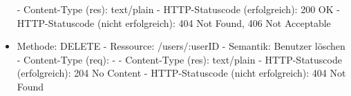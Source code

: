 \begin{itemize}
	\noindent\hspace*{10mm} - Content-Type (res): text/plain \newline
	\noindent\hspace*{10mm} - HTTP-Statuscode (erfolgreich): 200 OK\newline
	\noindent\hspace*{10mm} - HTTP-Statuscode (nicht erfolgreich): 404 Not Found, 406 Not Acceptable
	\item Methode: DELETE\newline
	\noindent\hspace*{10mm} - Ressource: /users/:userID \newline
	\noindent\hspace*{10mm} - Semantik: Benutzer löschen \newline
	\noindent\hspace*{10mm} - Content-Type (req): - \newline
	\noindent\hspace*{10mm} - Content-Type (res): text/plain \newline
	\noindent\hspace*{10mm} - HTTP-Statuscode (erfolgreich): 204 No Content\newline
	\noindent\hspace*{10mm} - HTTP-Statuscode (nicht erfolgreich): 404 Not Found
	\end{itemize}
